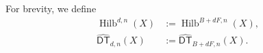 \documentclass{amsart}
\theoremstyle{definition}
\newcommand{\CC} {\mathbb{C}}          %
\newcommand{\ZZ} {\mathbb{Z}}		%
\renewcommand{\O}{\mathcal{O}}
\newcommand{\Hilb}{\operatorname{Hilb}}
\newcommand{\DT}{\mathsf{DT}}
\newcommand{\conn}{\operatorname{conn}}
\newcommand{\DThat}{\widehat{\DT}}
\begin{document}
\begin{comment}
Let $\beta = B+dF \in H_2(S)$. Denote by $X = \mathrm{Tot}(K_S)$ the total space of the canonical bundle over $S$. Then $X$ is a non-compact Calabi-Yau 3-fold. Consider the Hilbert scheme
$$
\Hilb^{\beta,n}(X) = \{ Z \subset X \ : \ [Z] = \beta, \ \chi(\O_Z) = n\}
$$
of proper subschemes $Z \subset X$ with fixed homology class and holomorphic Euler characteristic. K.~Behrend associates to any $\CC$-scheme of finite type $Y$ a constructible function $\nu : Y \rightarrow \ZZ$ \cite{Beh}. Applied to $\Hilb^{\beta,n}(X)$, the Donaldson-Thomas invariants of $X$ can be defined as\footnote{If $X$ is a \emph{compact} Calabi-Yau 3-fold, R.P.~Thomas's original definition of the DT invariant is the degree of the virtual cycle of $\Hilb^{\beta,n}(X)$ \cite{Tho}. Behrend showed this is the same as $e(\Hilb^{\beta,n}(X),\nu)$ \cite{Beh}. The advantage of the definition by means of virtual cycles is that the construction works relative to a base. This implies deformation invariance of the invariants.} 
$$
\DT_{\beta,n}(X) := \int_{\Hilb^{\beta,n}(X)} \nu \, de := \sum_{k \in \ZZ} k \, e(\nu^{-1}(\{k\})),
$$
where $e(\cdot)$ denotes topological Euler characteristic. Many of the key properties of DT invariants are already captured by the more classical Euler characteristic version\footnote{From the point of view of \cite{JS, Bri}, there are two natural integration maps on the semi-classical Hall-algebra. One corresponds to weighing by the Behrend function. The other corresponds to weighing by the ``trivial'' constant constructible function 1. The former gives rise to $\DT(X)$ and the latter to $\DThat (X)$.}
$$
\DThat _{\beta,n}(X) := \int_{\Hilb^{\beta,n}(X)} 1 \, de = e(\Hilb^{\beta,n}(X)).
$$
\end{comment}


For brevity, we define
\begin{align*}
\Hilb^{d,n}(X) &:=\Hilb^{B+dF,n}(X), \\
\DThat _{d,n}(X) &:= \DThat_{B+dF,n}(X).
\end{align*}


\begin{comment}
The generating functions of interest are
\begin{align*}
\DT(X) &:= \sum_{d \geq 0} \DT_d(X) \, q^d := \sum_{d \geq 0} \sum_{n \in \ZZ} \DT_{d,n}(X) \, (-p)^n q^d, \\
\DThat (X) &:= \sum_{d \geq 0} \DThat _d(X) \, q^d := \sum_{d \geq 0} \sum_{n \in \ZZ} \DThat _{d,n}(X) \, p^n q^d.
\end{align*}
The corresponding connected series $\DT^{\conn}(X)$ and $\DThat ^{\conn}(X)$ are obtained after dividing by
\begin{align*}
&\sum_{d \geq 0} \sum_{n \in \ZZ} e(\Hilb^{dF,n}(X),\nu) \, (-p)^n q^d, \\
&\sum_{d \geq 0} \sum_{n \in \ZZ} e(\Hilb^{dF,n}(X)) \, p^n q^d,
\end{align*}
respectively.
\end{comment}
\end{document}
